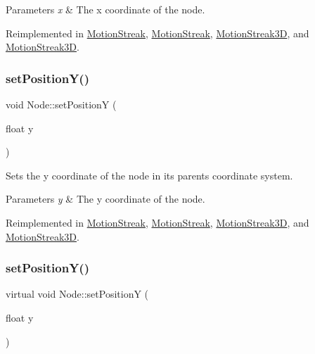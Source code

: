 \begin{DoxyParams}{Parameters}
{\em x} & The x coordinate of the node. \\
\hline
\end{DoxyParams}


Reimplemented in \hyperlink{classMotionStreak_af6cb7fe8388e16af000893b75c9676a0}{Motion\+Streak}, \hyperlink{classMotionStreak_aabc8d8fedcddd0f9e1e77b090ce8f7ed}{Motion\+Streak}, \hyperlink{classMotionStreak3D_a1b723a27b44aa12ced168fe18ca920de}{Motion\+Streak3D}, and \hyperlink{classMotionStreak3D_a9c363f74a20d8b5e83357343ecfad7d4}{Motion\+Streak3D}.

\mbox{\label{classNode_a5c97d36655f0daa71a5f6c715d2b0470}} 
\subsubsection{\texorpdfstring{set\+Position\+Y()}{setPositionY()}\hspace{0.1cm}{\footnotesize\ttfamily [1/2]}}
{\footnotesize\ttfamily void Node\+::set\+PositionY (\begin{DoxyParamCaption}\item[{float}]{y }\end{DoxyParamCaption})\hspace{0.3cm}{\ttfamily [virtual]}}

Sets the y coordinate of the node in its parent\textquotesingle{}s coordinate system.


\begin{DoxyParams}{Parameters}
{\em y} & The y coordinate of the node. \\
\hline
\end{DoxyParams}


Reimplemented in \hyperlink{classMotionStreak_a75b545604e6a5f2351f6d4b034edb185}{Motion\+Streak}, \hyperlink{classMotionStreak_a78b4896032c6ef6e21ce5d9012d82d13}{Motion\+Streak}, \hyperlink{classMotionStreak3D_a8f63bcfa700cf9d67907d9e6f31bace6}{Motion\+Streak3D}, and \hyperlink{classMotionStreak3D_afb3de2f3e93486b5be3877d081159d57}{Motion\+Streak3D}.

\mbox{\label{classNode_acec74667c8b24b5164e536b999bc8eaa}} 
\subsubsection{\texorpdfstring{set\+Position\+Y()}{setPositionY()}\hspace{0.1cm}{\footnotesize\ttfamily [2/2]}}
{\footnotesize\ttfamily virtual void Node\+::set\+PositionY (\begin{DoxyParamCaption}\item[{float}]{y }\end{DoxyParamCaption})\hspace{0.3cm}{\ttfamily [virtual]}}

